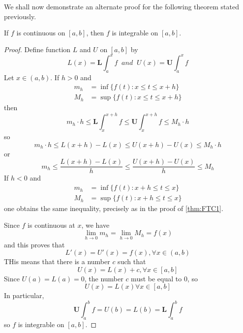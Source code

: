 We shall now demonstrate an alternate proof for the following theorem stated previously.



\begin{thm}
    If $f$ is continuous on $[a,b]$, then $f$ is integrable on $[a,b]$.
\end{thm}
\begin{proof}
    Define function $L$ and $U$ on $[a,b]$ by \begin{equation*}
        L(x) = \mathbf{L}\int_a^xf\;\;and\;\;U(x) = \mathbf{U}\int_a^xf
    \end{equation*}
    Let $x \in (a,b)$. If $h > 0$ and \begin{align*}
        m_h &= \inf\{f(t):x\leq t \leq x+h\} \\
        M_h &= \sup\{f(t): x\leq t\leq x+h\} 
    \end{align*}
    then \begin{equation*}
        m_h\cdot h \leq \mathbf{L}\int_x^{x+h}f \leq \mathbf{U}\int_x^{x+h}f\leq M_h\cdot h
    \end{equation*}
    so \begin{equation*}
        m_h\cdot h \leq L(x+h) - L(x) \leq U(x+h) - U(x) \leq M_h\cdot h
    \end{equation*}
    or \begin{equation*}
        m_h\leq \frac{L(x+h)-L(x)}{h} \leq \frac{U(x+h)-U(x)}{h} \leq M_h
    \end{equation*}
    If $h < 0$ and \begin{align*}
        m_h &= \inf\{f(t):x+h\leq t \leq x\} \\
        M_h &= \sup\{f(t): x+h\leq t\leq x\} 
    \end{align*}
    one obtains the same inequality, precisely as in the proof of \ref{thm:FTC1}.

    Since $f$ is continuous at $x$, we have \begin{equation*}
        \lim\limits_{h\rightarrow 0}m_h = \lim\limits_{h\rightarrow 0}M_h = f(x)
    \end{equation*}
    and this proves that \begin{equation*}
        L'(x) = U'(x) = f(x),\forall x\in(a,b)
    \end{equation*}
    THis means that there is a number $c$ such that \begin{equation*}
        U(x) = L(x) + c,\forall x \in [a,b]
    \end{equation*}
    Since $U(a) = L(a) = 0$, the number $c$ must be equal to $0$, so \begin{equation*}
        U(x) = L(x) \forall x \in [a,b]
    \end{equation*}
    In particular, \begin{equation*}
        \mathbf{U}\int_a^bf = U(b) = L(b) = \mathbf{L}\int_a^bf
    \end{equation*}
    so $f$ is integrable on $[a,b]$.
\end{proof}


